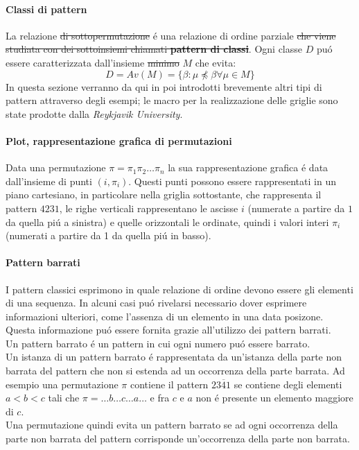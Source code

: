 \paragraph*{Classi di pattern} La relazione \st{di sottopermutazione} \'e una relazione di ordine parziale \st{che viene studiata con dei sottoinsiemi chiamati \textbf{pattern di classi}}. Ogni classe $D$ pu\'o essere caratterizzata dall'insieme \st{minimo} $M$ che evita:$$ D = Av(M) = \{\beta:\mu\not\preceq\beta\forall\mu\in M\}$$
In questa sezione verranno da qui in poi introdotti brevemente altri tipi di pattern\cite{branden2011mesh} attraverso degli esempi; le macro per la realizzazione delle griglie sono state prodotte dalla \textit{Reykjavik University}\cite{patternmacros}.
\paragraph*{Plot, rappresentazione grafica di permutazioni} Data una permutazione $\pi = \pi_1\pi_2\dots\pi_n$ la sua rappresentazione grafica \'e data dall'insieme di punti $(i,\pi_i)$. Questi punti possono essere rappresentati in un piano cartesiano, in particolare nella griglia sottostante, che rappresenta il pattern $4231$, le righe verticali rappresentano le ascisse $i$ (numerate a partire da $1$ da quella pi\'u a sinistra) e quelle orizzontali le ordinate, quindi i valori interi $\pi_i$ (numerati a partire da 1 da quella pi\'u in basso).
\begin{center}\end{center}
\paragraph*{Pattern barrati} I pattern classici esprimono in quale relazione di ordine devono essere gli elementi di una sequenza. In alcuni casi pu\'o rivelarsi necessario dover esprimere informazioni ulteriori, come l'assenza di un elemento in una data posizone. Questa informazione pu\'o essere fornita grazie all'utilizzo dei pattern barrati.\\
Un pattern barrato \'e un pattern in cui ogni numero pu\'o essere barrato.\\
Un istanza di un pattern barrato \'e rappresentata da un'istanza della parte non barrata del pattern che non si estenda ad un occorrenza della parte barrata. Ad esempio una permutazione $\pi$ contiene il pattern $23\overline{4}1$ se contiene degli elementi $a<b<c$ tali che $\pi=\dots b \dots c \dots a\dots$ e fra $c$ e $a$ non \'e presente un elemento maggiore di $c$.\\
Una permutazione quindi evita un pattern barrato se ad ogni occorrenza della parte non barrata del pattern corrisponde un'occorrenza della parte non barrata.
